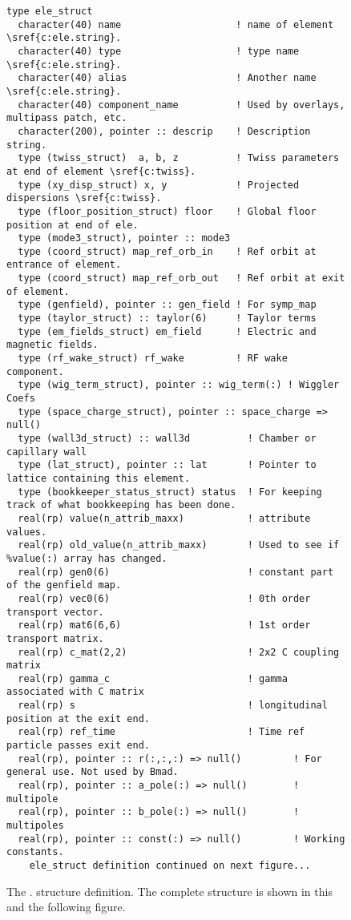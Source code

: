 \begin{figure}[tb]
\centering
\footnotesize
\begin{verbatim}
type ele_struct
  character(40) name                    ! name of element \sref{c:ele.string}.
  character(40) type                    ! type name \sref{c:ele.string}.
  character(40) alias                   ! Another name \sref{c:ele.string}.
  character(40) component_name          ! Used by overlays, multipass patch, etc.
  character(200), pointer :: descrip    ! Description string.
  type (twiss_struct)  a, b, z          ! Twiss parameters at end of element \sref{c:twiss}.
  type (xy_disp_struct) x, y            ! Projected dispersions \sref{c:twiss}.
  type (floor_position_struct) floor    ! Global floor position at end of ele.
  type (mode3_struct), pointer :: mode3 
  type (coord_struct) map_ref_orb_in    ! Ref orbit at entrance of element.
  type (coord_struct) map_ref_orb_out   ! Ref orbit at exit of element.
  type (genfield), pointer :: gen_field ! For symp_map
  type (taylor_struct) :: taylor(6)     ! Taylor terms
  type (em_fields_struct) em_field      ! Electric and magnetic fields.
  type (rf_wake_struct) rf_wake         ! RF wake component.
  type (wig_term_struct), pointer :: wig_term(:) ! Wiggler Coefs
  type (space_charge_struct), pointer :: space_charge => null()
  type (wall3d_struct) :: wall3d          ! Chamber or capillary wall
  type (lat_struct), pointer :: lat       ! Pointer to lattice containing this element.
  type (bookkeeper_status_struct) status  ! For keeping track of what bookkeeping has been done.
  real(rp) value(n_attrib_maxx)           ! attribute values.
  real(rp) old_value(n_attrib_maxx)       ! Used to see if %value(:) array has changed.
  real(rp) gen0(6)                        ! constant part of the genfield map.
  real(rp) vec0(6)                        ! 0th order transport vector.
  real(rp) mat6(6,6)                      ! 1st order transport matrix.
  real(rp) c_mat(2,2)                     ! 2x2 C coupling matrix
  real(rp) gamma_c                        ! gamma associated with C matrix
  real(rp) s                              ! longitudinal position at the exit end.
  real(rp) ref_time                       ! Time ref particle passes exit end.
  real(rp), pointer :: r(:,:,:) => null()         ! For general use. Not used by Bmad.
  real(rp), pointer :: a_pole(:) => null()        ! multipole
  real(rp), pointer :: b_pole(:) => null()        ! multipoles
  real(rp), pointer :: const(:) => null()         ! Working constants.
    ele_struct definition continued on next figure...
\end{verbatim}
\caption[The  (part 1).]{The . structure definition. 
The complete structure is shown in this and the following figure.}
\label{f:ele.struct1}
\end{figure}

